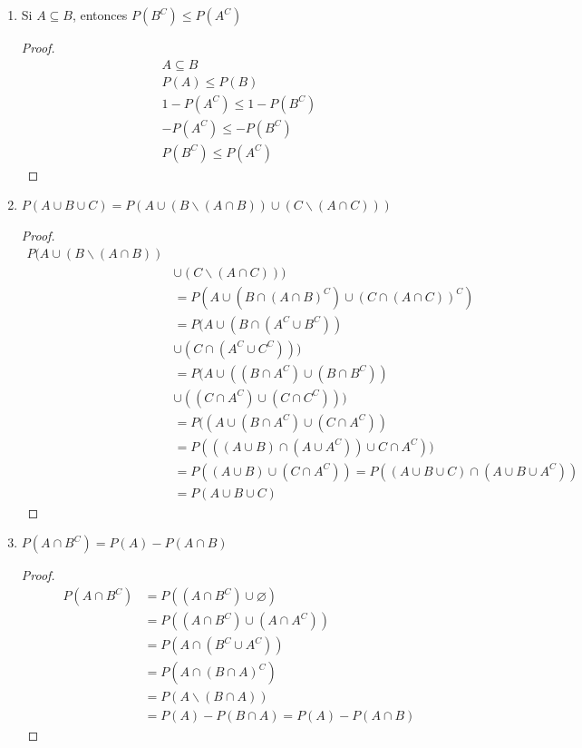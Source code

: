 \begin{enumerate}
\begin{enumerate}
        \item Si $A \subseteq B$, entonces $P(B^C) \leq P(A^C)$
        \begin{proof}
        \begin{gather*}
        A \subseteq B \\
        P(A) \leq P(B) \\
        1 - P(A^C) \leq 1 - P(B^C) \\
        - P(A^C) \leq - P(B^C) \\
        P(B^C) \leq P(A^C)
        \end{gather*}
        \end{proof}
        
        \item $P(A \cup B \cup C) = P(A \cup (B \backslash (A \cap B)) \cup (C \backslash (A \cap C)))$
        \begin{proof}
        \begin{align*}
        P(A \cup (B \backslash (A \cap B)) \\
        &\cup (C \backslash (A \cap C))) \\
        &= P(A \cup (B \cap (A \cap B)^C) \cup (C \cap (A \cap C))^C) \\
        &= P(A \cup (B \cap (A^C \cup B^C)) \\
        &\cup (C \cap (A^C \cup C^C))) \\
        &= P(A \cup ((B \cap A^C) \cup (B \cap B^C)) \\
        &\cup ((C \cap A^C) \cup (C \cap C^C))) \\
        &= P((A \cup (B \cap A^C) \cup (C\cap A^C)) \\
        &= P(((A \cup B) \cap (A \cup A^C)) \cup C \cap A^C)) \\
        &= P((A \cup B) \cup (C \cap A^C)) = P((A \cup B \cup C) \cap (A \cup B \cup A^C)) \\
        &= P(A \cup B \cup C)
        \end{align*}
        \end{proof}
        
        \item $P(A \cap B^C) = P(A) - P(A \cap B)$
        \begin{proof}
        \begin{align*}
        P(A \cap B^C) &= P((A \cap B^C) \cup \diameter) \\
        &= P((A \cap B^C) \cup (A \cap A^C)) \\
        &= P(A \cap (B^C \cup A^C)) \\
        &= P(A \cap (B \cap A)^C) \\
        &= P(A \backslash (B \cap A)) \\
        &= P(A) - P(B \cap A) = P(A) - P(A \cap B)
        \end{align*}
         \end{proof}
    \end{enumerate}
    

\end{enumerate}
